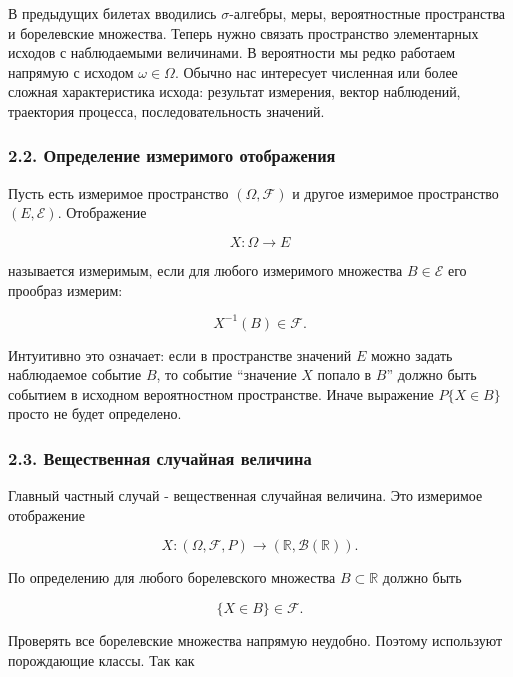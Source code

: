 \documentclass[
  11pt,
  a4paper,
]{article}
\begin{document}
В предыдущих билетах вводились \(\sigma\)-алгебры, меры, вероятностные
пространства и борелевские множества. Теперь нужно связать пространство
элементарных исходов с наблюдаемыми величинами. В вероятности мы редко
работаем напрямую с исходом \(\omega\in\Omega\). Обычно нас интересует
численная или более сложная характеристика исхода: результат измерения,
вектор наблюдений, траектория процесса, последовательность значений.

\subsubsection{2.2. Определение измеримого
отображения}\label{ux43eux43fux440ux435ux434ux435ux43bux435ux43dux438ux435-ux438ux437ux43cux435ux440ux438ux43cux43eux433ux43e-ux43eux442ux43eux431ux440ux430ux436ux435ux43dux438ux44f}

Пусть есть измеримое пространство \((\Omega,\mathcal F)\) и другое
измеримое пространство \((E,\mathcal E)\). Отображение

\[
X:\Omega\to E
\]

называется измеримым, если для любого измеримого множества
\(B\in\mathcal E\) его прообраз измерим:

\[
X^{-1}(B)\in\mathcal F.
\]

Интуитивно это означает: если в пространстве значений \(E\) можно задать
наблюдаемое событие \(B\), то событие ``значение \(X\) попало в \(B\)''
должно быть событием в исходном вероятностном пространстве. Иначе
выражение \(P\{X\in B\}\) просто не будет определено.

\subsubsection{2.3. Вещественная случайная
величина}\label{ux432ux435ux449ux435ux441ux442ux432ux435ux43dux43dux430ux44f-ux441ux43bux443ux447ux430ux439ux43dux430ux44f-ux432ux435ux43bux438ux447ux438ux43dux430}

Главный частный случай - вещественная случайная величина. Это измеримое
отображение

\[
X:(\Omega,\mathcal F,P)\to(\mathbb R,\mathcal B(\mathbb R)).
\]

По определению для любого борелевского множества \(B\subset\mathbb R\)
должно быть

\[
\{X\in B\}\in\mathcal F.
\]

Проверять все борелевские множества напрямую неудобно. Поэтому
используют порождающие классы. Так как
\end{document}
